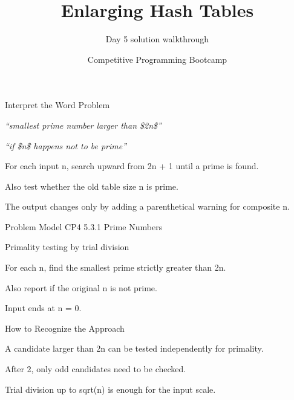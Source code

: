 \documentclass[aspectratio=169,11pt]{beamer}
\title[enlarginghashtables]{Enlarging Hash Tables}
\subtitle{Day 5 solution walkthrough}
\author[Solution Deck]{Competitive Programming Bootcamp}
\date{}
\begin{document}
\begin{frame}[plain]
  \titlepage
\end{frame}

\begin{frame}{Interpret the Word Problem}
\small
{}
\begin{tightitemize}
  \item \textit{``smallest prime number larger than \$2n\$''}
  \item \textit{``if \$n\$ happens not to be prime''}
\end{tightitemize}

\vspace{0.18cm}
\begin{tightitemize}
  \item For each input n, search upward from 2n + 1 until a prime is found.
  \item Also test whether the old table size n is prime.
  \item The output changes only by adding a parenthetical warning for composite n.
\end{tightitemize}
\end{frame}







\begin{frame}{Problem Model}
\small
{} CP4 5.3.1 Prime Numbers

\vspace{0.25cm}
 Primality testing by trial division

\vspace{0.25cm}
\begin{tightitemize}
  \item For each n, find the smallest prime strictly greater than 2n.
  \item Also report if the original n is not prime.
  \item Input ends at n = 0.
\end{tightitemize}
\end{frame}

\begin{frame}{How to Recognize the Approach}
\begin{tightitemize}
  \item A candidate larger than 2n can be tested independently for primality.
  \item After 2, only odd candidates need to be checked.
  \item Trial division up to sqrt(n) is enough for the input scale.
\end{tightitemize}
\end{frame}
\end{document}
